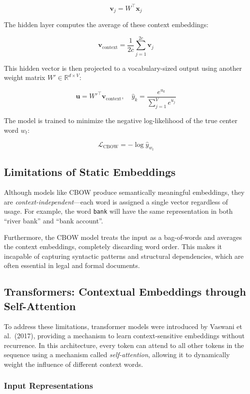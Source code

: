 \documentclass{article}
\begin{document}
\[
\mathbf{v}_j = W^\top \mathbf{x}_j
\]

The hidden layer computes the average of these context embeddings:

\[
\mathbf{v}_{\text{context}} = \frac{1}{2c} \sum_{j=1}^{2c} \mathbf{v}_j
\]

This hidden vector is then projected to a vocabulary-sized output using another weight matrix $W' \in \mathbb{R}^{d \times V}$:

\[
\mathbf{u} = W'^\top \mathbf{v}_{\text{context}}, \quad \hat{y}_k = \frac{e^{u_k}}{\sum_{j=1}^{V} e^{u_j}}
\]

The model is trained to minimize the negative log-likelihood of the true center word $w_t$:

\[
\mathcal{L}_{\text{CBOW}} = -\log \hat{y}_{w_t}
\]

\subsection{Limitations of Static Embeddings}

Although models like CBOW produce semantically meaningful embeddings, they are \emph{context-independent}—each word is assigned a single vector regardless of usage. For example, the word \texttt{bank} will have the same representation in both “river bank” and “bank account”.

Furthermore, the CBOW model treats the input as a bag-of-words and averages the context embeddings, completely discarding word order. This makes it incapable of capturing syntactic patterns and structural dependencies, which are often essential in legal and formal documents.

\subsection{Transformers: Contextual Embeddings through Self-Attention}

To address these limitations, transformer models were introduced by Vaswani et al.~(2017), providing a mechanism to learn context-sensitive embeddings without recurrence. In this architecture, every token can attend to all other tokens in the sequence using a mechanism called \emph{self-attention}, allowing it to dynamically weight the influence of different context words.

\subsubsection{Input Representations}
\end{document}
